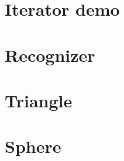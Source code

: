 \documentclass[11pt, listof=totoc]{article}
\begin{document}
  \thispagestyle{empty} \makeheading \tableofcontents \newpage \setcounter{page}{1}

  \section{Iterator demo}       
  \newpage \section{Recognizer} 
  \newpage \section{Triangle}   
  \newpage \section{Sphere}     

  \newpage
  \renewcommand{\refname}{\thesection. References} 
  \printbibliography
   
\end{document}
